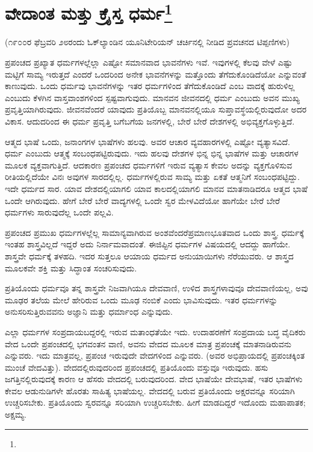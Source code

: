 
\chapter[ವೇದಾಂತ ಮತ್ತು ಕ್ರೈಸ್ತ ಧರ್ಮ]{ವೇದಾಂತ ಮತ್ತು ಕ್ರೈಸ್ತ ಧರ್ಮ\protect\footnote{}}

\begin{center}
(೧೯೦೦ರ ಫೆಬ್ರವರಿ ೨೮ರಂದು ಓಕ್‌ಲ್ಯಾಂಡಿನ ಯೂನಿಟೇರಿಯನ್ ಚರ್ಚಿನಲ್ಲಿ ನೀಡಿದ ಪ್ರವಚನದ ಟಿಪ್ಪಣಿಗಳು)
\end{center}

ಪ್ರಪಂಚದ ಪ್ರಖ್ಯಾತ ಧರ್ಮಗಳಲ್ಲೆಲ್ಲಾ ಎಷ್ಟೋ ಸಮಾನವಾದ ಭಾವನೆಗಳು ಇವೆ. ಇವುಗಳಲ್ಲಿ ಕೆಲವು ವೇಳೆ ಎಷ್ಟು ಮಟ್ಟಿಗೆ ಸಾಮ್ಯ ಇರುತ್ತದೆ ಎಂದರೆ ಒಂದರಿಂದ ಅನೇಕ ಭಾವನೆಗಳನ್ನು ಮತ್ತೊಂದು ತೆಗೆದುಕೊಂಡಿದೆಯೋ ಎನ್ನುವಂತೆ ಕಾಣುವುದು. ಒಂದು ಧರ್ಮವು ಭಾವನೆಗಳನ್ನು ಇತರ ಧರ್ಮಗಳಿಂದ ತೆಗೆದುಕೊಂಡಿದೆ ಎಂಬ ವಾದಕ್ಕೆ ಹುರುಳಿಲ್ಲ ಎಂಬುದು ಕೆಳಗಿನ ವಾಸ್ತವಾಂಶಗಳಿಂದ ಸ್ಪಷ್ಟವಾಗುವುದು. ಮಾನವನ ಜೀವನದಲ್ಲಿ ಧರ್ಮ ಎಂಬುದು ಅವನ ಮುಖ್ಯ ಪ್ರವೃತ್ತಿಯಾಗಿರುವುದು. ಜೀವನವೆಂದರೆ ಯಾವುದು ಪ್ರತಿಯೊಬ್ಬ ಮಾನವನಲ್ಲಿಯೂ ಸುಪ್ತಾವಸ್ಥೆಯಲ್ಲಿರುವುದೋ ಅದರ ವಿಕಾಸ. ಆದುದರಿಂದ ಈ ಧರ್ಮ ಪ್ರವೃತ್ತಿ ಬಗೆಬಗೆಯ ಜನಗಳಲ್ಲಿ, ಬೇರೆ ಬೇರೆ ದೇಶಗಳಲ್ಲಿ ಅಭಿವ್ಯಕ್ತಗೊಳ್ಳುತ್ತಿದೆ.

ಆತ್ಮದ ಭಾಷೆ ಒಂದು, ಜನಾಂಗಗಳ ಭಾಷೆಗಳು ಹಲವು. ಅವರ ಆಚಾರ ವ್ಯವಹಾರಗಳಲ್ಲಿ ಎಷ್ಟೋ ವ್ಯತ್ಯಾಸವಿದೆ. ಧರ್ಮ ಎಂಬುದು ಆತ್ಮಕ್ಕೆ ಸಂಬಂಧಪಟ್ಟಿರುವುದು. ಇದು ಹಲವು ದೇಶಗಳ ಭಿನ್ನ ಭಿನ್ನ ಭಾಷೆಗಳ ಮತ್ತು ಆಚಾರಗಳ ಮೂಲಕ ವ್ಯಕ್ತವಾಗುತ್ತಿದೆ. ಆದಕಾರಣ ಪ್ರಪಂಚದ ಧರ್ಮಗಳಿಗೆ ಇರುವ ವ್ಯತ್ಯಾಸ ಕೇವಲ ಅದನ್ನು ವ್ಯಕ್ತಗೊಳಿಸುವ ರೀತಿಯಲ್ಲಿದೆಯೇ ವಿನಃ ಅವುಗಳ ಸಾರದಲ್ಲಿಲ್ಲ. ಧರ್ಮಗಳಲ್ಲಿರುವ ಸಾಮ್ಯ ಮತ್ತು ಏಕತೆ ಆತ್ಮನಿಗೆ ಸಂಬಂಧಪಟ್ಟಿದ್ದು. ಇದೇ ಧರ್ಮದ ಸಾರ. ಯಾವ ದೇಶದಲ್ಲಿಯಾಗಲಿ ಯಾವ ಕಾಲದಲ್ಲಿಯಾಗಲಿ ಮಾನವ ಮಾತನಾಡಿದರೂ ಆತ್ಮದ ಭಾಷೆ ಒಂದೇ ಆಗಿರುವುದು. ಹೇಗೆ ಬೇರೆ ಬೇರೆ ವಾದ್ಯಗಳಲ್ಲಿ ಒಂದೇ ಸ್ವರ ಮೇಳವಿದೆಯೋ ಹಾಗೆಯೇ ಬೇರೆ ಬೇರೆ ಧರ್ಮಗಳು ಸಾರುವುದೆಲ್ಲ ಒಂದೇ ಪಲ್ಲವಿ.

ಪ್ರಪಂಚದ ಪ್ರಮುಖ ಧರ್ಮಗಳಲ್ಲೆಲ್ಲ ಸಾಮಾನ್ಯವಾಗಿರುವ ಅಂಶವೆಂದರೆ\break ಪ್ರಮಾಣಭೂತವಾದ ಒಂದು ಶಾಸ್ತ್ರ. ಧರ್ಮಕ್ಕೆ ಇಂತಹ ಶಾಸ್ತ್ರವಿಲ್ಲದೆ ಇದ್ದರೆ ಅದು ನಿರ್ನಾಮವಾದಂತೆ. ಈಜಿಪ್ಟಿನ ಧರ್ಮಗಳ ವಿಷಯದಲ್ಲಿ ಆದದ್ದು ಹಾಗೆಯೇ. ಶಾಸ್ತ್ರವೇ ಧರ್ಮಕ್ಕೆ ತಳಹದಿ. ಇದರ ಸುತ್ತಲೂ ಆಯಾಯ ಧರ್ಮದ ಅನುಯಾಯಿಗಳು ನೆರೆಯುವರು. ಆ ಶಾಸ್ತ್ರದ ಮೂಲಕವೇ ಶಕ್ತಿ ಮತ್ತು ಸಿದ್ಧಾಂತ ಸಂಚರಿಸುವುದು.

ಪ್ರತಿಯೊಂದು ಧರ್ಮವೂ ತನ್ನ ಶಾಸ್ತ್ರವೇ ನಿಜವಾಗಿಯೂ ದೇವವಾಣಿ, ಉಳಿದ ಶಾಸ್ತ್ರಗಳಾವುವೂ ದೇವವಾಣಿಯಲ್ಲ, ಅವು ಮೂಢರ ತಲೆಯ ಮೇಲೆ ಹೇರಿರುವ ಒಂದು ಮೂಢ ನಂಬಿಕೆ ಎಂದು ಭಾವಿಸುವುದು. ಇತರ ಧರ್ಮಗಳನ್ನು ಅನುಸರಿಸುತ್ತಿರುವವನು ಅಜ್ಞಾನಿ ಮತ್ತು ಧರ್ಮಾಂಧ ಎನ್ನುವುದು.

ಎಲ್ಲಾ ಧರ್ಮಗಳ ಸಂಪ್ರದಾಯಬದ್ದರಲ್ಲಿ ಇರುವ ಮತಾಂಧತೆಯೇ ಇದು. ಉದಾಹರಣೆಗೆ ಸಂಪ್ರದಾಯ ಬದ್ಧ ವೈದಿಕರು ವೇದ ಒಂದೇ ಪ್ರಪಂಚದಲ್ಲಿ ಭಗವಂತನ ವಾಣಿ, ಅವನು ವೇದದ ಮೂಲಕ ಮಾತ್ರ ಪ್ರಪಂಚಕ್ಕೆ ಮಾತನಾಡಿರುವನು ಎನ್ನುವರು. ಇದು ಮಾತ್ರವಲ್ಲ, ಪ್ರಪಂಚ ಇರುವುದೇ ವೇದಗಳಿಂದ ಎನ್ನುವರು. (ಅವರ ಅಭಿಪ್ರಾಯದಲ್ಲಿ ಪ್ರಪಂಚಕ್ಕಿಂತ ಮುಂಚೆ ವೇದವಿತ್ತು). ವೇದದಲ್ಲಿರುವುದರಿಂದ ಪ್ರಪಂಚದಲ್ಲಿ ಪ್ರತಿಯೊಂದು ವಸ್ತುವೂ ಇರುವುದು. ಹಸು ಜಗತ್ತಿನಲ್ಲಿರುವುದಕ್ಕೆ ಕಾರಣ ಆ ಹೆಸರು ವೇದದಲ್ಲಿ ಬರುವುದರಿಂದ. ವೇದ ಭಾಷೆಯೇ ದೇವಭಾಷೆ, ಇತರ ಭಾಷೆಗಳು ಕೇವಲ ಆಡುನುಡಿಗಳೇ ಹೊರತು ಸಾಹಿತ್ಯ ಭಾಷೆಯಲ್ಲ. ವೇದದಲ್ಲಿ ಬರುವ ಪ್ರತಿಯೊಂದು ಅಕ್ಷರವನ್ನೂ ಸರಿಯಾಗಿ ಉಚ್ಚರಿಸಬೇಕು. ಪ್ರತಿಯೊಂದು ಸ್ವರವನ್ನೂ ಸರಿಯಾಗಿ ಉಚ್ಚರಿಸಬೇಕು. ಹೀಗೆ ಮಾಡದಿದ್ದರೆ ಇದೊಂದು ಮಹಾಪಾತಕ; ಅಕ್ಷಮ್ಯ.

